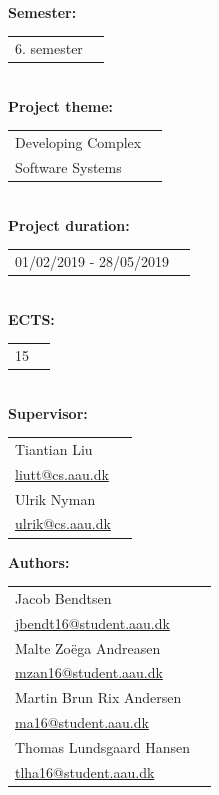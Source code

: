 \newpage
\makeatother
\begin{minipage}[T]{0.45\textwidth}
 \begin{flushleft}
  \textbf{\normalsize{}}\\ \maketitle
  \textbf{\normalsize{Semester:}}\\
  \begin{tabular}{ll}
  \normalsize{6. semester}
  \end{tabular}\\
  \textbf{\normalsize{Project theme:}}\\
  \begin{tabular}{ll}
    \normalsize{Developing Complex}\\
    \normalsize{Software Systems}
  \end{tabular}\\
  \textbf{\normalsize{Project duration:}}\\
  \begin{tabular}{ll}
    \normalsize{01/02/2019 - 28/05/2019}
  \end{tabular}\\
  \textbf{\normalsize{ECTS:}}\\
  \begin{tabular}{ll}
  	\normalsize{15}
  \end{tabular}\\
  \textbf{\normalsize{Supervisor:}}\\
  \begin{tabular}{ll}
    \normalsize{Tiantian Liu}\\
    \href{mailto:liutt@cs.aau.dk}{liutt@cs.aau.dk}\\
    \normalsize{Ulrik Nyman}\\
    \href{mailto:ulrik@cs.aau.dk}{ulrik@cs.aau.dk}\\
  \end{tabular}

  \textbf{\normalsize{Authors:}}\\
  \begin{tabular}{ll}
   \normalsize{Jacob Bendtsen}\\
   \href{mailto:jbendt16@student.aau.dk}{jbendt16@student.aau.dk}\\
   \normalsize{Malte Zoëga Andreasen}\\
   \href{mailto:mzan16@student.aau.dk}{mzan16@student.aau.dk}\\
   \normalsize{Martin Brun Rix Andersen}\\
   \href{mailto:ma16@student.aau.dk}{ma16@student.aau.dk}\\
   \normalsize{Thomas Lundsgaard Hansen}\\
   \href{mailto:tlha16@student.aau.dk}{tlha16@student.aau.dk}\\
  \end{tabular}
 \end{flushleft}
\end{minipage}
